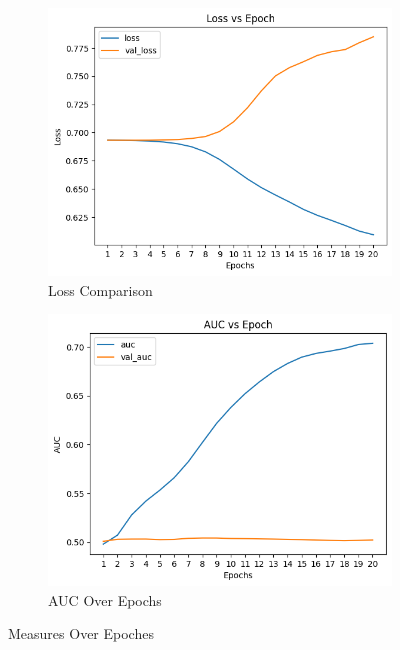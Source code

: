 \begin{figure}[H]
    \centering
    \begin{subfigure}{.5\textwidth}
        \centering
        \includegraphics[width=0.95\linewidth]{assets/loss_epochs_20.png}
        \caption[Loss Comparison]{Loss Comparison}
        \label{fig:LossComparison}
    \end{subfigure}%
    \begin{subfigure}{.5\textwidth}
        \centering
        \includegraphics[width=0.95\linewidth]{assets/auc_epochs_20.png}
        \caption[AUC Over Epochs]{AUC Over Epochs}
        \label{fig:AUCOverEpochs}
    \end{subfigure}
    \caption[Measures Over Epoches]{Measures Over Epoches}
\end{figure}
